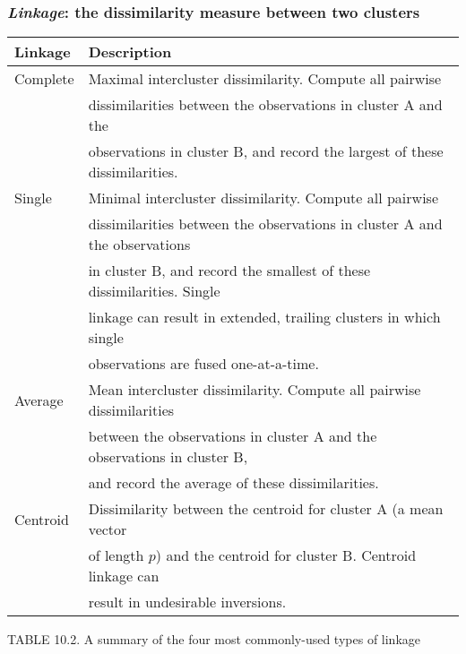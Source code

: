 \documentclass{beamer}
\begin{document}
                   \begin{frame}
                   	\frametitle{ {\it Linkage}: the dissimilarity measure between two clusters }
                   	\centering 
                   	{\scriptsize  
                   	\begin{tabular}{ | l |  l   |}
                   		\hline
                   	Linkage &  Description \\
                   	\hline 
                   	Complete & 
                   	Maximal intercluster dissimilarity. Compute all pairwise\\
                   	&  dissimilarities between the observations in cluster A and the
                    \\ & 	   observations   in cluster B, and record the largest of these  
                   	dissimilarities. \\
                   	
                   	\hline
                   	Single & 
                   	Minimal intercluster dissimilarity. Compute all pairwise
                   	 \\ &   dissimilarities between the observations in cluster A and the
                   	observations
                   	\\ &   in cluster B,  and record the smallest of these
                   	dissimilarities. Single 
                   	 \\ &  linkage can result in extended, trailing
                   	clusters in which single \\ & observations are fused one-at-a-time. \\
                   	  \hline
                   	Average & 
                   	Mean intercluster dissimilarity. Compute all pairwise dissimilarities
                   	 \\ & between the observations in cluster A and the
                   	observations in cluster B, 
                   	 \\ & and record the average of these
                   	dissimilarities. \\
  \hline
                   	Centroid & 
                   	Dissimilarity between the centroid for cluster A (a mean
                   	vector \\ &   of length $p$) and
                   	  the centroid for cluster B. Centroid
                   	linkage can \\ &   result in undesirable inversions.
                   	 \\  
                   		\hline
                   	\end{tabular}
                   }
                   
                 {\scriptsize   TABLE 10.2. A summary of the four most commonly-used types of linkage}
                   \end{frame}
                   
\end{document}
